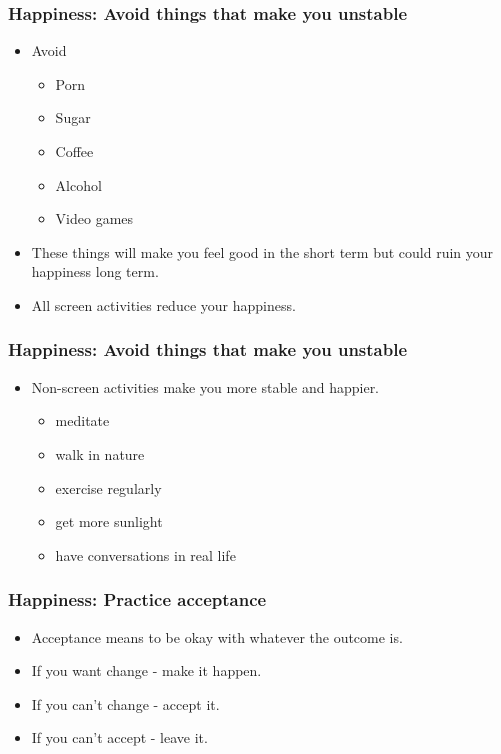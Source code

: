 \begin{frame}[fragile]\frametitle{ Happiness: Avoid things that make you unstable}

\begin{itemize}
\item Avoid
\begin{itemize}
\item Porn
\item Sugar
\item Coffee
\item  Alcohol
\item Video games 
\end{itemize}
\item These things will make you feel good in the short term but could ruin your happiness long term.
\item All screen activities reduce your happiness.
\end{itemize}

\end{frame}

\begin{frame}[fragile]\frametitle{ Happiness: Avoid things that make you unstable}

\begin{itemize}
\item Non-screen activities make you more stable and happier.
\begin{itemize}
\item meditate
\item  walk in nature
\item  exercise regularly
\item  get more sunlight
\item  have conversations in real life
\end{itemize}
\end{itemize}

\end{frame}


\begin{frame}[fragile]\frametitle{ Happiness: Practice acceptance}

\begin{itemize}
\item Acceptance means to be okay with whatever the outcome is.
\item If you want change - make it happen.
\item If you can’t change - accept it.
\item If you can’t accept - leave it.
\end{itemize}

\end{frame}

